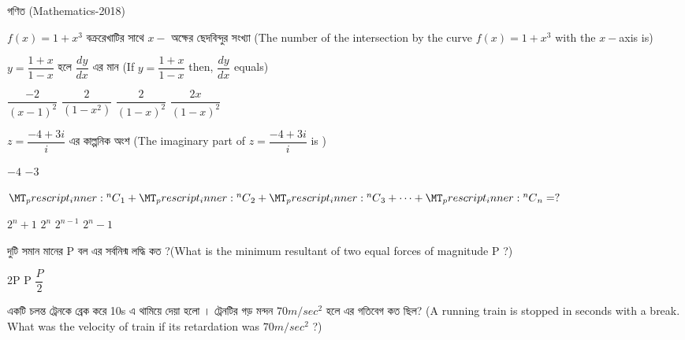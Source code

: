 \documentclass[addpoints]{exam}
\newcommand\Mycomb[2][^n]{\prescript{#1\mkern-0.5mu}{}C_{#2}}
\begin{document}
\begin{LARGE}
\begin{center}
গণিত (Mathematics-2018)
\end{center}
\end{LARGE}
\begin{questions}

 \question  $ f(x) = 1+x^3 $ বক্ররেখাটির সাথে $ x- $ অক্ষের ছেদবিন্দুর সংখ্যা (The number of the intersection by the curve $ f(x) = 1+x^3 $ with the $ x- $axis is)

\begin{oneparchoices}

\end{oneparchoices}

\question  $ y = \dfrac{1+x}{1-x} $ হলে $ \dfrac{dy}{dx} $ এর মান (If $ y = \dfrac{1+x}{1-x} $ then, $ \dfrac{dy}{dx} $ equals)

\begin{oneparchoices}
\choice $ \dfrac{-2}{(x-1)^2} $
\choice $ \dfrac{2}{(1-x^2)} $
\choice $ \dfrac{2}{(1-x)^2} $
\choice $ \dfrac{2x}{(1-x)^2} $

\end{oneparchoices}

\question  $ z= \dfrac{-4+3i}{i} $ এর কাল্পনিক অংশ (The imaginary part of $ z= \dfrac{-4+3i}{i} $ is )

\begin{oneparchoices}
\choice $ -4 $
\choice  $ -3 $
\end{oneparchoices}

\question  $\Mycomb{1} + \Mycomb{2} +\Mycomb{3} + \cdots + \Mycomb{n} = ?$ 

\begin{oneparchoices}
\choice $ 2^{n} + 1 $
\choice $ 2^{n} $
\choice $ 2^{n-1} $
\choice  $ 2^{n} - 1 $
\end{oneparchoices}

\question  দুটি সমান মানের P বল এর সর্বনিন্ম লদ্ধি কত ?(What is the minimum resultant of two equal forces of magnitude P ?) 

\begin{oneparchoices}
\choice 2P
\choice P
\choice $ \dfrac{P}{2} $

\end{oneparchoices}


\question  একটি চলন্ত ট্রেনকে ব্রেক করে 10s এ থামিয়ে দেয়া হলো । ট্রেনটির গড় মন্দন $ 70m/sec^{2} $ হলে এর গতিবেগ কত ছিল? (A running train is stopped in seconds with a break. What was the velocity of train if its retardation was $ 70m/sec^{2} $ ?)


\end{questions}
\end{document}

